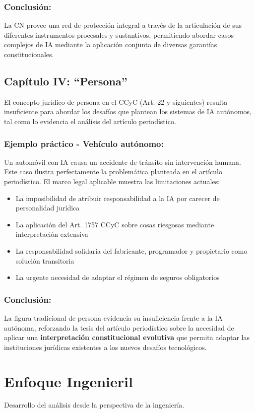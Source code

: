 \documentclass[10pt, a4paper]{article}
\begin{document}
\subsubsection*{Conclusión:}
La CN provee una red de protección integral a través de la articulación de sus diferentes instrumentos procesales y sustantivos, permitiendo abordar casos complejos de IA mediante la aplicación conjunta de diversas garantías constitucionales.
\subsection{Capítulo IV: ``Persona''}
\label{subsec:persona}

El concepto jurídico de persona en el CCyC (Art. 22 y siguientes) resulta insuficiente para abordar los desafíos que plantean los sistemas de IA autónomos, tal como lo evidencia el análisis del artículo periodístico.

\subsubsection*{Ejemplo práctico - Vehículo autónomo:}
Un automóvil con IA causa un accidente de tránsito sin intervención humana. Este caso ilustra perfectamente la problemática planteada en el artículo periodístico. El marco legal aplicable muestra las limitaciones actuales:
\begin{itemize}
    \item  La imposibilidad de atribuir responsabilidad a la IA por carecer de personalidad jurídica
    \item  La aplicación del Art. 1757 CCyC sobre cosas riesgosas mediante interpretación extensiva
    \item  La responsabilidad solidaria del fabricante, programador y propietario como solución transitoria
    \item  La urgente necesidad de adaptar el régimen de seguros obligatorios
\end{itemize}

\subsubsection*{Conclusión:}
La figura tradicional de persona evidencia su insuficiencia frente a la IA autónoma, reforzando la tesis del artículo periodístico sobre la necesidad de aplicar una \textbf{interpretación constitucional evolutiva} que permita adaptar las instituciones jurídicas existentes a los nuevos desafíos tecnológicos.
\section{Enfoque Ingenieril}
\label{sec:ingenieril}
Desarrollo del análisis desde la perspectiva de la ingeniería.
\end{document}
